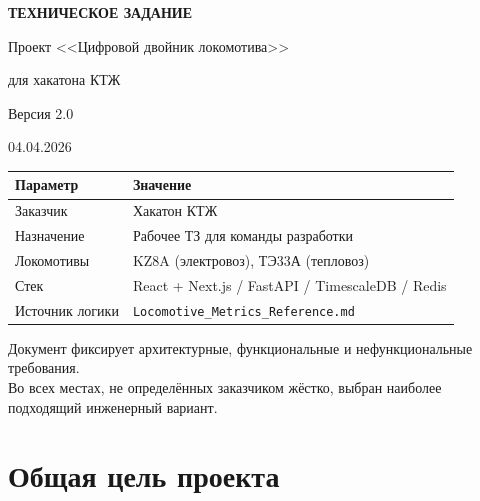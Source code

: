 \documentclass[12pt,a4paper]{article}
\newcommand{\code}[1]{\texttt{#1}}
\begin{document}
\begin{titlepage}
\centering
\vspace*{3cm}
{\Huge\bfseries ТЕХНИЧЕСКОЕ ЗАДАНИЕ\par}
\vspace{0.8cm}
{\LARGE Проект <<Цифровой двойник локомотива>>\par}
\vspace{0.4cm}
{\LARGE для хакатона КТЖ\par}
\vspace{2cm}
{\Large Версия 2.0\par}
\vspace{0.5cm}
{\large 04.04.2026\par}

\vfill

\begin{tabular}{ll}
\toprule
\textbf{Параметр} & \textbf{Значение} \\
\midrule
Заказчик & Хакатон КТЖ \\
Назначение & Рабочее ТЗ для команды разработки \\
Локомотивы & KZ8A (электровоз), ТЭ33А (тепловоз) \\
Стек & React + Next.js / FastAPI / TimescaleDB / Redis \\
Источник логики & \code{Locomotive\_Metrics\_Reference.md} \\
\bottomrule
\end{tabular}

\vspace{1.5cm}
{\small Документ фиксирует архитектурные, функциональные и нефункциональные требования.\\ Во всех местах, не определённых заказчиком жёстко, выбран наиболее подходящий инженерный вариант.}
\end{titlepage}

\tableofcontents
\newpage

\section{Общая цель проекта}
\end{document}

